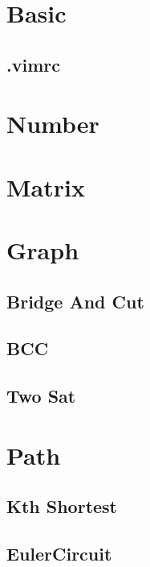 \documentclass[10pt,twocolumn,oneside]{article}
\begin{document}
\pagestyle{fancy}
\fancyfoot{}
\fancyhead[R]{\thepage}
\renewcommand{\headrulewidth}{0.4pt}
\renewcommand{\contentsname}{Codebook} 

\scriptsize
\tableofcontents

\newpage

\section{Basic}
\subsection{.vimrc}



\section{Number}


\section{Matrix}

\section{Graph}
\subsection{Bridge And Cut}
\subsection{BCC}
\subsection{Two Sat}

\section{Path}
\subsection{Kth Shortest}
\subsection{EulerCircuit}
\end{document}
